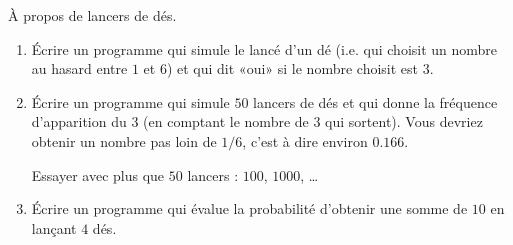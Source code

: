 
\begin{exercice}\label{exosmath-0579}

    À propos de lancers de dés.
    \begin{enumerate}
        \item
            Écrire un programme qui simule le lancé d'un dé (i.e. qui choisit un nombre au hasard entre \( 1\) et \( 6\)) et qui dit «oui» si le nombre choisit est \( 3\).
        \item
            Écrire un programme qui simule \( 50\) lancers de dés et qui donne la fréquence d'apparition du \( 3\) (en comptant le nombre de \( 3\) qui sortent). Vous devriez obtenir un nombre pas loin de \( 1/6\), c'est à dire environ \( 0.166\).

            Essayer avec plus que \( 50\) lancers : \( 100\), \( 1000\), \ldots
        \item
            Écrire un programme qui évalue la probabilité d'obtenir une somme de \( 10\) en lançant \( 4\) dés.
    \end{enumerate}

\end{exercice}
